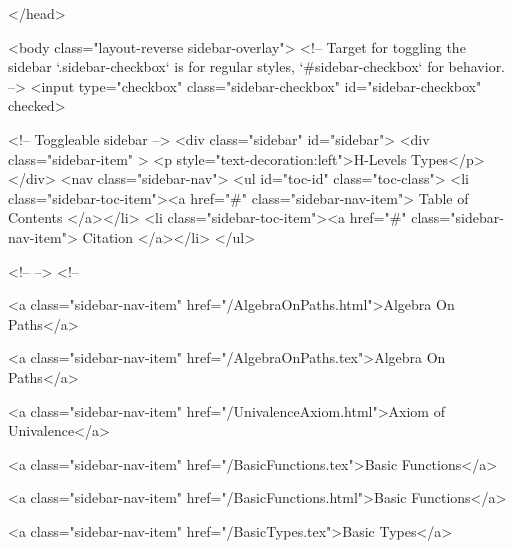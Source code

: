   
</head>




  <body class="layout-reverse sidebar-overlay">
    <!-- Target for toggling the sidebar `.sidebar-checkbox` is for regular
     styles, `#sidebar-checkbox` for behavior. -->
<input type="checkbox" class="sidebar-checkbox" id="sidebar-checkbox" checked>

<!-- Toggleable sidebar -->
<div class="sidebar" id="sidebar">
  <div class="sidebar-item" >
    <p style="text-decoration:left">H-Levels Types</p>
  </div>
  <nav class="sidebar-nav">
    <ul id="toc-id" class="toc-class">
  <li class="sidebar-toc-item"><a href="#" class="sidebar-nav-item"> Table of Contents </a></li>
  <li class="sidebar-toc-item"><a href="#" class="sidebar-nav-item"> Citation </a></li>
</ul>


    <!--  -->
    <!-- 
      
    
      
    
      
    
      
        
      
    
      
        
          <a class="sidebar-nav-item" href="/AlgebraOnPaths.html">Algebra On Paths</a>
        
      
    
      
        
          <a class="sidebar-nav-item" href="/AlgebraOnPaths.tex">Algebra On Paths</a>
        
      
    
      
        
          <a class="sidebar-nav-item" href="/UnivalenceAxiom.html">Axiom of Univalence</a>
        
      
    
      
        
          <a class="sidebar-nav-item" href="/BasicFunctions.tex">Basic Functions</a>
        
      
    
      
        
          <a class="sidebar-nav-item" href="/BasicFunctions.html">Basic Functions</a>
        
      
    
      
        
          <a class="sidebar-nav-item" href="/BasicTypes.tex">Basic Types</a>
        
      
    
      
        
